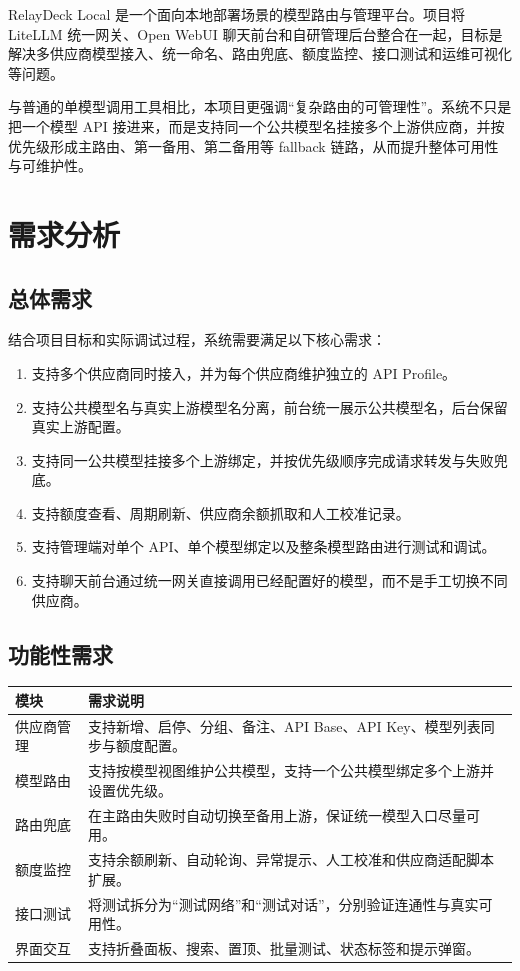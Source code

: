 \documentclass[12pt,a4paper]{ctexart}
\begin{document}
RelayDeck Local 是一个面向本地部署场景的模型路由与管理平台。项目将 LiteLLM 统一网关、Open WebUI 聊天前台和自研管理后台整合在一起，目标是解决多供应商模型接入、统一命名、路由兜底、额度监控、接口测试和运维可视化等问题。

与普通的单模型调用工具相比，本项目更强调“复杂路由的可管理性”。系统不只是把一个模型 API 接进来，而是支持同一个公共模型名挂接多个上游供应商，并按优先级形成主路由、第一备用、第二备用等 fallback 链路，从而提升整体可用性与可维护性。

\section{需求分析}

\subsection{总体需求}

结合项目目标和实际调试过程，系统需要满足以下核心需求：

\begin{enumerate}[label=\arabic*.]
  \item 支持多个供应商同时接入，并为每个供应商维护独立的 API Profile。
  \item 支持公共模型名与真实上游模型名分离，前台统一展示公共模型名，后台保留真实上游配置。
  \item 支持同一公共模型挂接多个上游绑定，并按优先级顺序完成请求转发与失败兜底。
  \item 支持额度查看、周期刷新、供应商余额抓取和人工校准记录。
  \item 支持管理端对单个 API、单个模型绑定以及整条模型路由进行测试和调试。
  \item 支持聊天前台通过统一网关直接调用已经配置好的模型，而不是手工切换不同供应商。
\end{enumerate}

\subsection{功能性需求}

\begin{longtable}{p{3.2cm}p{10.2cm}}
\toprule
模块 & 需求说明 \\
\midrule
\endhead
供应商管理 & 支持新增、启停、分组、备注、API Base、API Key、模型列表同步与额度配置。 \\
模型路由 & 支持按模型视图维护公共模型，支持一个公共模型绑定多个上游并设置优先级。 \\
路由兜底 & 在主路由失败时自动切换至备用上游，保证统一模型入口尽量可用。 \\
额度监控 & 支持余额刷新、自动轮询、异常提示、人工校准和供应商适配脚本扩展。 \\
接口测试 & 将测试拆分为“测试网络”和“测试对话”，分别验证连通性与真实可用性。 \\
界面交互 & 支持折叠面板、搜索、置顶、批量测试、状态标签和提示弹窗。 \\
\bottomrule
\end{longtable}
\end{document}
